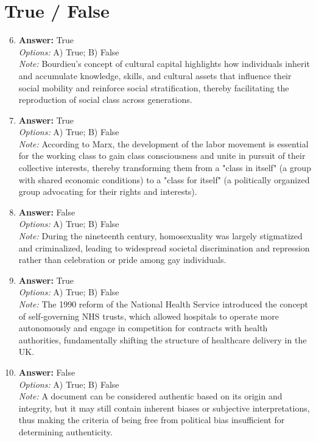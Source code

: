 \documentclass[12pt]{article}
\begin{document}
\section*{True / False}
\begin{enumerate}[label=\arabic*.]
\setcounter{enumi}{5}
\item \textbf{Answer:} True
\\ \textit{Options:} A) True; B) False
\\ \textit{Note:} Bourdieu's concept of cultural capital highlights how individuals inherit and accumulate knowledge, skills, and cultural assets that influence their social mobility and reinforce social stratification, thereby facilitating the reproduction of social class across generations.
\item \textbf{Answer:} True
\\ \textit{Options:} A) True; B) False
\\ \textit{Note:} According to Marx, the development of the labor movement is essential for the working class to gain class consciousness and unite in pursuit of their collective interests, thereby transforming them from a "class in itself" (a group with shared economic conditions) to a "class for itself" (a politically organized group advocating for their rights and interests).
\item \textbf{Answer:} False
\\ \textit{Options:} A) True; B) False
\\ \textit{Note:} During the nineteenth century, homosexuality was largely stigmatized and criminalized, leading to widespread societal discrimination and repression rather than celebration or pride among gay individuals.
\item \textbf{Answer:} True
\\ \textit{Options:} A) True; B) False
\\ \textit{Note:} The 1990 reform of the National Health Service introduced the concept of self-governing NHS trusts, which allowed hospitals to operate more autonomously and engage in competition for contracts with health authorities, fundamentally shifting the structure of healthcare delivery in the UK.
\item \textbf{Answer:} False
\\ \textit{Options:} A) True; B) False
\\ \textit{Note:} A document can be considered authentic based on its origin and integrity, but it may still contain inherent biases or subjective interpretations, thus making the criteria of being free from political bias insufficient for determining authenticity.
\end{enumerate}
\end{document}
